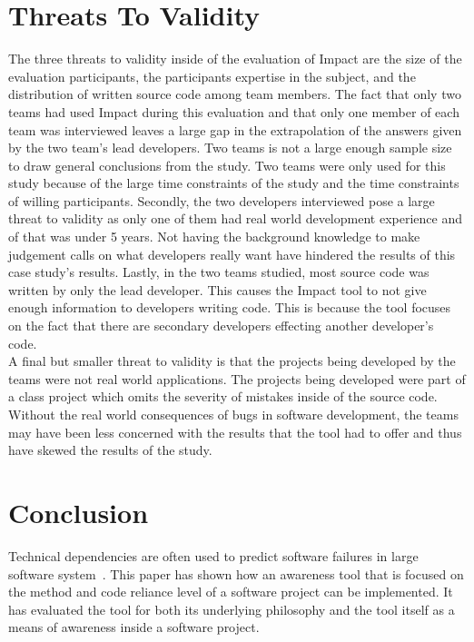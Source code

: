 \documentclass[conference]{IEEEtran}
\begin{document}
\section{Threats To Validity}
The three threats to validity inside of the evaluation of Impact are the size of the evaluation
participants, the participants expertise in the subject, and the distribution of written
source code among team members. The fact that only two teams had
used Impact during this evaluation and that only one member of each team was interviewed
leaves a large gap in the extrapolation of the answers given by the two team's lead 
developers. Two teams is not a large enough sample size to draw general conclusions
from the study. Two teams were only used for this study because of the large time constraints
of the study and the time constraints of willing participants. Secondly, the two developers
interviewed pose a large threat to validity as only one of them had real world development
experience and of that was under 5 years. Not having the background knowledge to make
judgement calls on what developers really want have hindered the results of this case study’s 
results.  Lastly, in the two teams studied, most source code was written by only the lead
developer. This causes the Impact tool to not give enough information to developers
writing code. This is because the tool focuses on the fact that there are secondary developers
effecting another developer's code.\\

A final but smaller threat to validity is that the projects being developed by the teams were
not real world applications. The projects being developed were part of a class project which
omits the severity of mistakes inside of the source code. Without the real world consequences
of bugs in software development, the teams may have been less concerned with the results
that the tool had to offer and thus have skewed the results of the study.\\

\section{Conclusion}
Technical dependencies are often used to predict software failures
in large software system~\cite{Pinzger:2008:DNP, Zimmermann:2008:PDU, Kim:2006:AIB}. 
This paper has shown how an awareness tool that is focused on the method and code reliance
level of a software project can be implemented. It has evaluated the tool for both its underlying
philosophy and the tool itself as a means of awareness inside a software project. \\
\end{document}
